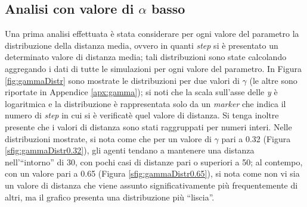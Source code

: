 \subsection{Analisi con valore di $\alpha$ basso}
\label{subsec:gammaalow}
Una prima analisi effettuata è stata considerare per ogni valore del parametro la distribuzione della distanza media, ovvero in quanti \textit{step} si è presentato un determinato valore di distanza media; tali distribuzioni sono state calcolando aggregando i dati di tutte le simulazioni per ogni valore del parametro.
In Figura \ref{fig:gammaDistr} sono mostrate le distribuzioni per due valori di $\gamma$ (le altre sono riportate in Appendice \ref{apx:gamma}); si noti che la scala sull'asse delle \textit{y} è logaritmica e la distribuzione è rappresentata solo da un \textit{marker} che indica il numero di \textit{step} in cui si è verificatè quel valore di distanza. Si tenga inoltre presente che i valori di distanza sono stati raggruppati per numeri interi.
Nelle distribuzioni mostrate, si nota come che per un valore di $\gamma$ pari a 0.32 (Figura \ref{sfig:gammaDistr0.32}), gli agenti tendano a mantenere una distanza nell'“intorno” di 30, con pochi casi di distanze pari o superiori a 50; al contempo, con un valore pari a 0.65 (Figura \ref{sfig:gammaDistr0.65}), si nota come non vi sia un valore di distanza che viene assunto significativamente più frequentemente di altri, ma il grafico presenta una distribuzione più “liscia”.\\
